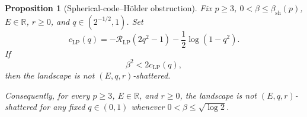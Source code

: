 \documentclass[11pt,reqno]{amsart}
\numberwithin{equation}{section}
\theoremstyle{plain}
\newtheorem{proposition}[proposition]{Proposition}
\theoremstyle{definition}
\theoremstyle{remark}
\newcommand{\R}{\mathbb R}
\newcommand{\1}{\mathbf 1}
\begin{document}
\begin{proposition}[Spherical-code--H\"older obstruction]
\label{prop:hotAllOverlap}
Fix \(p\geq3\), \(0<\beta\leq\beta_{\mathrm{sh}}(p)\), \(E\in\R\),
\(r\geq0\), and \(q\in(2^{-1/2},1)\).  Set
\begin{equation}\label{eq:cLPq}
 c_{\mathrm{LP}}(q)
 =-\mathcal R_{\mathrm{LP}}(2q^2-1)
  -\frac12\log(1-q^2).
\end{equation}
If
\begin{equation}\label{eq:qDependentCodeCriterion}
 \beta^2<2c_{\mathrm{LP}}(q),
\end{equation}
then the landscape is not \((E,q,r)\)-shattered.

Consequently, for every \(p\geq3\), \(E\in\R\), and \(r\geq0\),
the landscape is not \((E,q,r)\)-shattered for any fixed
\(q\in(0,1)\) whenever \(0<\beta\leq\sqrt{\log2}\).
\end{proposition}
\end{document}
